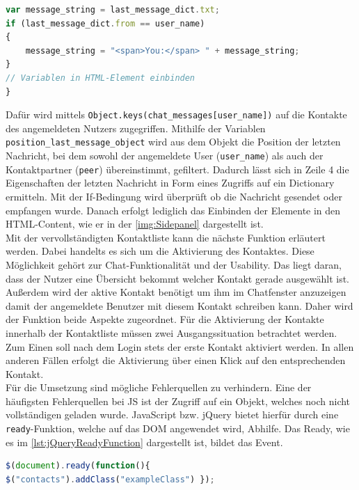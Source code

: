\documentclass[a4paper,titlepage,halfparskip,12pt]{scrreprt}
\begin{document}
\begin{onehalfspacing}
\begin{lstlisting}[language=Javascript,caption=HTML Elemente für \texttt{fillInContactPeers()},label={lst:HTMLElementsForContaclistfunction}]
var message_string = last_message_dict.txt;
if (last_message_dict.from == user_name)
{
	message_string = "<span>You:</span> " + message_string;
}
// Variablen in HTML-Element einbinden
}
\end{lstlisting}
Dafür wird mittels \texttt{Object.keys(chat\_messages[user\_name])} auf die Kontakte des angemeldeten Nutzers zugegriffen. Mithilfe der Variablen \texttt{position\_last\_message\_object} wird aus dem Objekt die Position der letzten Nachricht, bei dem sowohl der angemeldete User (\texttt{user\_name}) als auch der Kontaktpartner (\texttt{peer}) übereinstimmt, gefiltert. Dadurch lässt sich in Zeile 4 die Eigenschaften der letzten Nachricht in Form eines Zugriffs auf ein Dictionary ermitteln. Mit der If-Bedingung wird überprüft ob die Nachricht gesendet oder empfangen wurde. Danach erfolgt lediglich das Einbinden der Elemente in den \ac{HTML}-Content, wie er in der \autoref{img:Sidepanel} dargestellt ist.\\
Mit der vervollständigten Kontaktliste kann die nächste Funktion erläutert werden. Dabei handelts es sich um die Aktivierung des Kontaktes. Diese Möglichkeit gehört zur Chat-Funktionalität und der Usability. Das liegt daran, dass der Nutzer eine Übersicht bekommt welcher Kontakt gerade ausgewählt ist. Außerdem wird der aktive Kontakt benötigt um ihm im Chatfenster anzuzeigen damit der angemeldete Benutzer mit diesem Kontakt schreiben kann. Daher wird der Funktion beide Aspekte zugeordnet. Für die Aktivierung der Kontakte innerhalb der Kontaktliste müssen zwei Ausgangssituation betrachtet werden. Zum Einen soll nach dem Login stets der erste Kontakt aktiviert werden. In allen anderen Fällen erfolgt die Aktivierung über einen Klick auf den entsprechenden Kontakt.\\
Für die Umsetzung sind mögliche Fehlerquellen zu verhindern. Eine der häufigsten Fehlerquellen bei \ac{JS} ist der Zugriff auf ein Objekt, welches noch nicht vollständigen geladen wurde. JavaScript bzw. jQuery bietet hierfür durch eine \texttt{ready}-Funktion, welche auf das \ac{DOM} angewendet wird, Abhilfe. Das \glqq Ready\grqq, wie es im \autoref{lst:jQueryReadyFunction} dargestellt ist, bildet das Event.

\begin{lstlisting}[language=Javascript,caption= Ready() Funktion von jQuery,label={lst:jQueryReadyFunction}]
$(document).ready(function(){
$("contacts").addClass("exampleClass") });
\end{lstlisting}


\end{onehalfspacing}
\end{document}
